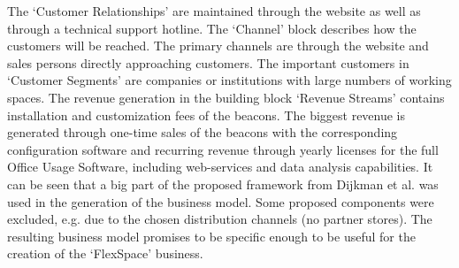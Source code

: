		The `Customer Relationships' are maintained through the website as well as through a technical support hotline. The `Channel' block describes how the customers will be reached. The primary channels are through the website and sales persons directly approaching customers. The important customers in `Customer Segments' are companies or institutions with large numbers of working spaces. The revenue generation in the building block `Revenue Streams' contains installation and customization fees of the beacons. The biggest revenue is generated through one-time sales of the beacons with the corresponding configuration software and recurring revenue through yearly licenses for the full Office Usage Software, including web-services and data analysis capabilities. It can be seen that a big part of the proposed framework from Dijkman et al. was used in the generation of the business model. Some proposed components were excluded, e.g. due to the chosen distribution channels (no partner stores). The resulting business model promises to be specific enough to be useful for the creation of the `FlexSpace' business.
	\vspace{-1em}
